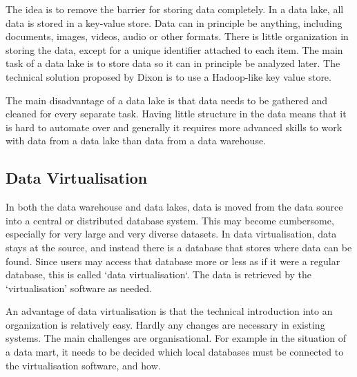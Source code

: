 The idea is to remove the barrier for storing data completely. In a data lake, all
data is stored in a key-value store. Data can in principle be anything, including
documents, images, videos, audio or other formats. There is little organization
in storing the data, except for a unique identifier attached to each item. The main
task of a data lake is to store data so it can in principle be analyzed later. The
technical solution proposed by Dixon is to use a Hadoop-like key value store.

The main disadvantage of a data lake is that data needs to be gathered and
cleaned for every separate task. Having little structure in the data means that
it is hard to automate over and generally it requires more advanced skills to
work with data from a data lake than data from a data warehouse.


\subsection{Data Virtualisation}
In both the data warehouse and data lakes, data is moved from the data source
into a central or distributed database system. This may become cumbersome,
especially for very large and very diverse datasets. In data virtualisation,
data stays at the source, and instead there is a database that stores where
data can be found. Since users may access that database more or less as if it
were a regular database, this is called `data virtualisation`. The data is
retrieved by the `virtualisation' software as needed.

An advantage of data virtualisation is that the technical introduction into an
organization is relatively easy. Hardly any changes are necessary in existing
systems. The main challenges are organisational. For example in the situation
of a data mart, it needs to be decided which local databases must be connected
to the virtualisation software, and how. 



